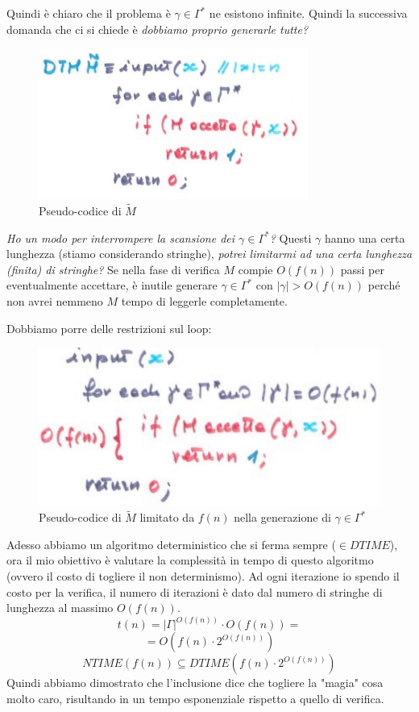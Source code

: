 \documentclass{article}
\begin{document}
Quindi è chiaro che il problema è $\gamma\in\Gamma^*$ ne esistono infinite. Quindi la
successiva domanda che ci si chiede è \textit{dobbiamo proprio generarle tutte?}

\begin{figure}[H]
    \centering
    \includegraphics[scale=0.6]{images/pseudtoDTM_tilde.png}
    \caption{Pseudo-codice di $\tilde{M}$}
\end{figure}
\textit{Ho un modo per interrompere la scansione dei $\gamma\in\Gamma^*$?} Questi $\gamma$
hanno una certa lunghezza (stiamo considerando stringhe), \textit{potrei limitarmi ad
una certa lunghezza (finita) di stringhe?} Se nella fase di verifica $M$ compie $O(f(n))$
passi per eventualmente accettare, è inutile generare $\gamma\in\Gamma^*$ con $|\gamma|>O(f(n))$
perché non avrei nemmeno $M$ tempo di leggerle completamente.

Dobbiamo porre delle restrizioni sul loop:

\begin{figure}[H]
    \centering
    \includegraphics[scale=0.6]{images/pseudtoDTM_tilde_corretto.png}
    \caption{Pseudo-codice di $\tilde{M}$ limitato da $f(n)$ nella generazione di $\gamma\in\Gamma^*$}
\end{figure}
Adesso abbiamo un algoritmo deterministico che si ferma sempre ($\in DTIME$), ora il mio
obiettivo è valutare la complessità in tempo di questo algoritmo (ovvero il costo
di togliere il non determinismo). Ad ogni iterazione io spendo il costo per la verifica,
il numero di iterazioni è dato dal numero di stringhe di lunghezza al massimo $O\left(f(n)\right)$.
$$t(n)=|\Gamma|^{O(f(n))}\cdot O\left(f(n)\right)=$$
$$=O\left(f(n)\cdot 2^{O\left(f(n)\right)}\right)$$
$$NTIME \left(f(n)\right)\subseteq DTIME\left(f(n)\cdot 2^{O(f(n))}\right)$$
Quindi abbiamo dimostrato che l'inclusione dice che togliere la "magia" cosa molto caro,
risultando in un tempo esponenziale rispetto a quello di verifica.
\end{document}
